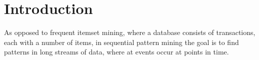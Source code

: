 \chapter{Introduction}

As opposed to frequent itemset mining, where a database consists of transactions, each with a number of items, in sequential pattern mining the goal is to find patterns in long streams of data, where at events occur at points in time.
